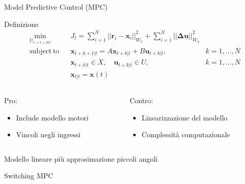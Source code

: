 \documentclass[]{beamer}
\DeclareMathOperator*{\subjectto}{subject\hspace{2pt}to}
\begin{document}
	\begin{frame}{Model Predictive Control (MPC)}
		\centering
		\begin{block}{Definizione}
			\setlength\abovedisplayskip{-10pt}
			\begin{align}
				&\min_{U_{t\to t+N|t}} &&J_t=\sum_{i=1}^N||\mathbf{r}_i-\mathbf{x}_i||^2_{W_x} + \sum_{i=1}^N||\boldsymbol{\Delta}\mathbf{u}||^2_{W_u} \label{eq:MPC} \nonumber \\
				&\subjectto &&\mathbf{x}_{t+k+1|t}=A\mathbf{x}_{t+k|t}+B\mathbf{u}_{t+k|t}, \quad & k=1,\dots,N \nonumber \\
				& &&\mathbf{x}_{t+k|t} \in X, \quad \mathbf{u}_{t+k|t} \in U, \quad & k=1,\dots,N \nonumber \\
				& &&\mathbf{x}_{t|t}=\mathbf{x}(t) \nonumber
			\end{align}
		\end{block}
		\begin{columns}
			\begin{column}{.5\textwidth}
				\centering
				Pro:
				\begin{itemize}
					\item Include modello motori
					\item Vincoli negli ingressi
				\end{itemize}
			\end{column}
			\begin{column}{.5\textwidth}
				\centering
				Contro:
				\begin{itemize}
					\item Linearizzazione del modello
					\item Complessità computazionale
				\end{itemize}
			\end{column}
		\end{columns}
	\end{frame}
	
	\begin{frame}
		\centering Modello lineare più approsimazione piccoli angoli 
		\begin{block}{Switching MPC}
			\begin{figure}
				
			\end{figure}
		\end{block}
	\end{frame}
	
\end{document}

